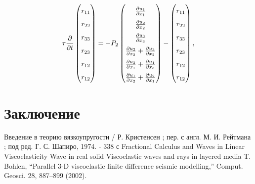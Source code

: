 \documentclass[a4paper, fontsize=14pt]{article}
\begin{document}
\begin{equation}
    \label{eq:system_on_r}
    \renewcommand\arraystretch{1.6}
    \tau \frac{\partial }{\partial t}
    \begin{pmatrix} 
        r_{11} \\
        r_{22} \\
        r_{33} \\
        r_{23} \\
        r_{12} \\
        r_{12} 
    \end{pmatrix} 
    = - P_2 
    \begin{pmatrix} 
        \frac{\partial u_1}{\partial x_1} \\
        \frac{\partial u_2}{\partial x_2} \\
        \frac{\partial u_3}{\partial x_3} \\
        \frac{\partial u_2}{\partial x_3} + \frac{\partial u_3}{\partial x_2} \\
        \frac{\partial u_3}{\partial x_1} + \frac{\partial u_1}{\partial x_3} \\
        \frac{\partial u_1}{\partial x_2} + \frac{\partial u_2}{\partial x_1}
        \end{pmatrix} -
        \begin{pmatrix} 
        r_{11} \\
        r_{22} \\
        r_{33} \\
        r_{23} \\
        r_{12} \\
        r_{12} 
        \end{pmatrix},
\end{equation}
\newpage
\section*{Заключение}

\newpage


\begin{thebibliography}{9}
     Введение в теорию вязкоупругости / Р. Кристенсен ; пер. с англ. М. И. Рейтмана ; под ред. Г. С. Шапиро, 1974. - 338 с
     Fractional Calculus and Waves in Linear Viscoelasticity
     Wave in real solid
     Viscoelastic waves and rays in layered media
     T. Bohlen, “Parallel 3-D viscoelastic finite difference seismic modelling,” Comput. Geosci. 28, 887–899
    (2002).
\end{thebibliography}
\end{document}
